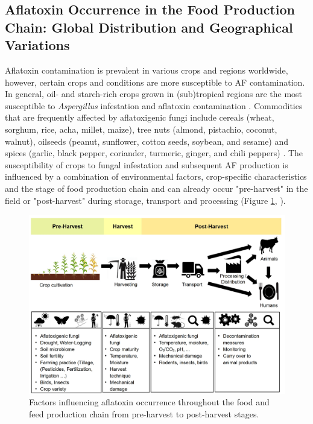 \subsection{Aflatoxin Occurrence in the Food Production Chain: Global Distribution and Geographical Variations} \label{subchap:occurence}

Aflatoxin contamination is prevalent in various crops and regions worldwide, however, certain crops and conditions are more susceptible to AF contamination. In general, oil- and starch-rich crops grown in (sub)tropical regions are the most susceptible to \textit{Aspergillus} infestation and aflatoxin contamination \citep{rushing2019aflatoxin, jallow2021worldwide}. Commodities that are frequently affected by aflatoxigenic fungi include cereals (wheat, sorghum, rice, acha, millet, maize), tree nuts (almond, pistachio, coconut, walnut), oilseeds (peanut, sunflower, cotton seeds, soybean, and sesame) and spices (garlic, black pepper, coriander, turmeric, ginger, and chili peppers) \citep{awuchi2022mycotoxins}. The susceptibility of crops to fungal infestation and subsequent AF production is influenced by a combination of environmental factors, crop-specific characteristics and the stage of food production chain and can already occur "pre-harvest" in the field or "post-harvest" during storage, transport and processing (Figure \ref{fig:Food_chain}, \cite{jallow2021worldwide}).

\begin{figure}[ht]
	\centering
	\includegraphics[width=1\textwidth,center]{figures/food chain.jpg}
	\decoRule
	\captionsetup{labelfont=bf, justification=justified, singlelinecheck=false, width=1\textwidth}
	\caption{Factors influencing aflatoxin occurrence throughout the food and feed production chain from pre-harvest to post-harvest stages.}
	\label{fig:Food_chain}
\end{figure}
\afterpage{\FloatBarrier}


